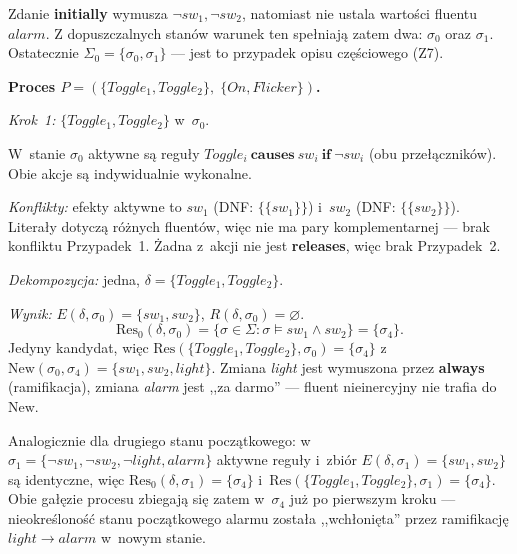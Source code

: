 \documentclass[11pt,a4paper]{article}
\newcommand{\causes}{\textbf{causes}}
\renewcommand{\iff}{\textbf{if}}
\newcommand{\initially}{\textbf{initially}}
\newcommand{\always}{\textbf{always}}
\newcommand{\releases}{\textbf{releases}}
\theoremstyle{definition}
\begin{document}
\noindent Zdanie \initially{} wymusza $\neg\mathit{sw_1}, \neg\mathit{sw_2}$,
natomiast nie ustala wartości fluentu $\mathit{alarm}$. Z dopuszczalnych stanów
warunek ten spełniają zatem dwa: $\sigma_0$ oraz $\sigma_1$. Ostatecznie
$\Sigma_0 = \{\sigma_0, \sigma_1\}$ --- jest to przypadek opisu częściowego (Z7).

\medskip
\noindent\textbf{Proces $P = (\{\mathit{Toggle_1}, \mathit{Toggle_2}\},\;
\{\mathit{On}, \mathit{Flicker}\})$.}

\medskip
\noindent\textit{Krok~1:} $\{\mathit{Toggle_1}, \mathit{Toggle_2}\}$ w~$\sigma_0$.

W~stanie $\sigma_0$ aktywne są reguły $\mathit{Toggle_i}\ \causes\ \mathit{sw_i}\ \iff\ \neg\mathit{sw_i}$
(obu przełączników). Obie akcje są indywidualnie wykonalne.

\smallskip\noindent
\emph{Konflikty:} efekty aktywne to $\mathit{sw_1}$ (DNF: $\{\{\mathit{sw_1}\}\}$) i~$\mathit{sw_2}$
(DNF: $\{\{\mathit{sw_2}\}\}$). Literały dotyczą różnych fluentów, więc nie ma pary komplementarnej
--- brak konfliktu Przypadek~1. Żadna z~akcji nie jest \releases{}, więc brak Przypadek~2.

\smallskip\noindent
\emph{Dekompozycja:} jedna, $\delta = \{\mathit{Toggle_1}, \mathit{Toggle_2}\}$.

\smallskip\noindent
\emph{Wynik:} $E(\delta, \sigma_0) = \{\mathit{sw_1}, \mathit{sw_2}\}$, $R(\delta, \sigma_0) = \varnothing$.
\[
  \mathrm{Res}_0(\delta, \sigma_0) = \{\sigma \in \Sigma : \sigma \models \mathit{sw_1} \land \mathit{sw_2}\} = \{\sigma_4\}.
\]
Jedyny kandydat, więc $\mathrm{Res}(\{\mathit{Toggle_1}, \mathit{Toggle_2}\}, \sigma_0) = \{\sigma_4\}$
z~$\mathrm{New}(\sigma_0, \sigma_4) = \{\mathit{sw_1}, \mathit{sw_2}, \mathit{light}\}$.
Zmiana \textit{light} jest wymuszona przez \always{} (ramifikacja), zmiana \textit{alarm}
jest ,,za darmo'' --- fluent nieinercyjny nie trafia do~$\mathrm{New}$.

\smallskip\noindent
Analogicznie dla drugiego stanu początkowego:
w~$\sigma_1 = \{\neg\mathit{sw_1}, \neg\mathit{sw_2}, \neg\mathit{light}, \mathit{alarm}\}$
aktywne reguły i~zbiór $E(\delta,\sigma_1) = \{\mathit{sw_1}, \mathit{sw_2}\}$ są identyczne,
więc $\mathrm{Res}_0(\delta, \sigma_1) = \{\sigma_4\}$ i~$\mathrm{Res}(\{\mathit{Toggle_1}, \mathit{Toggle_2}\}, \sigma_1) = \{\sigma_4\}$.
Obie gałęzie procesu zbiegają się zatem w~$\sigma_4$ już po pierwszym kroku
--- nieokreśloność stanu początkowego alarmu została ,,wchłonięta'' przez
ramifikację $\mathit{light} \to \mathit{alarm}$ w~nowym stanie.
\end{document}
